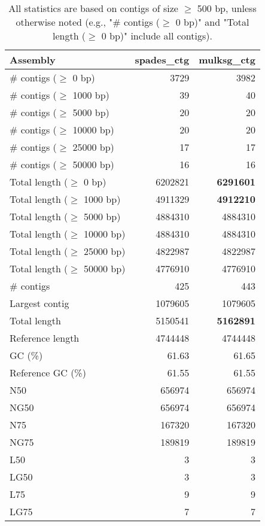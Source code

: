 \documentclass[12pt,a4paper]{article}
\begin{document}
\begin{table}[ht]
\begin{center}
\caption{All statistics are based on contigs of size $\geq$ 500 bp, unless otherwise noted (e.g., "\# contigs ($\geq$ 0 bp)" and "Total length ($\geq$ 0 bp)" include all contigs).}
\begin{tabular}{|l*{2}{|r}|}
\hline
Assembly & spades\_ctg & mulksg\_ctg \\ \hline
\# contigs ($\geq$ 0 bp) & 3729 & 3982 \\ \hline
\# contigs ($\geq$ 1000 bp) & 39 & 40 \\ \hline
\# contigs ($\geq$ 5000 bp) & 20 & 20 \\ \hline
\# contigs ($\geq$ 10000 bp) & 20 & 20 \\ \hline
\# contigs ($\geq$ 25000 bp) & 17 & 17 \\ \hline
\# contigs ($\geq$ 50000 bp) & 16 & 16 \\ \hline
Total length ($\geq$ 0 bp) & 6202821 & {\bf 6291601} \\ \hline
Total length ($\geq$ 1000 bp) & 4911329 & {\bf 4912210} \\ \hline
Total length ($\geq$ 5000 bp) & 4884310 & 4884310 \\ \hline
Total length ($\geq$ 10000 bp) & 4884310 & 4884310 \\ \hline
Total length ($\geq$ 25000 bp) & 4822987 & 4822987 \\ \hline
Total length ($\geq$ 50000 bp) & 4776910 & 4776910 \\ \hline
\# contigs & 425 & 443 \\ \hline
Largest contig & 1079605 & 1079605 \\ \hline
Total length & 5150541 & {\bf 5162891} \\ \hline
Reference length & 4744448 & 4744448 \\ \hline
GC (\%) & 61.63 & 61.65 \\ \hline
Reference GC (\%) & 61.55 & 61.55 \\ \hline
N50 & 656974 & 656974 \\ \hline
NG50 & 656974 & 656974 \\ \hline
N75 & 167320 & 167320 \\ \hline
NG75 & 189819 & 189819 \\ \hline
L50 & 3 & 3 \\ \hline
LG50 & 3 & 3 \\ \hline
L75 & 9 & 9 \\ \hline
LG75 & 7 & 7 \\ \hline

\end{tabular}
\end{center}
\end{table}
\end{document}
